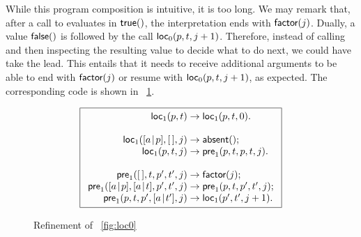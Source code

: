 While this program composition is intuitive, it is too long. We may
remark that, after a call to 
evaluates in \(\textsf{true}()\), the interpretation ends with
\(\textsf{factor}(j)\). Dually, a value \(\textsf{false}()\) is followed by
the call
\(\textsf{loc}_0(p,t,j+1)\). Therefore,
instead of calling  and then inspecting the resulting value
to decide what to do next, we could have  take the
lead. This entails that it needs to receive additional arguments to be
able to end with \(\textsf{factor}(j)\) or resume with
\(\textsf{loc}_0(p,t,j+1)\), as expected. The corresponding code is shown
in \fig~\ref{fig:loc1}.
\begin{figure}[t]
\begin{equation*}
\boxed{%
\begin{array}{r@{\;}l@{\;}l}
\fun{loc}_1(p,t)   & \rightarrow & \fun{loc}_1(p,t,0).\\
\\
\fun{loc}_1(\cons{a}{p},\el,j) & \rightarrow & \fun{absent}();\\
\fun{loc}_1(p,t,j) & \rightarrow & \fun{pre}_1(p,t,p,t,j).\\
\\
\fun{pre}_1(\el,t,p',t',j) & \rightarrow & \fun{factor}(j);\\
\fun{pre}_1(\cons{a}{p},\cons{a}{t},p',t',j)
                   & \rightarrow & \fun{pre}_1(p,t,p',t',j);\\
\fun{pre}_1(p,t,p',\cons{a}{t'},j) & \rightarrow & \fun{loc}_1(p',t',j+1).
\end{array}}
\end{equation*}
\caption{Refinement of \fig~\vref{fig:loc0}
\label{fig:loc1}}
\end{figure}

